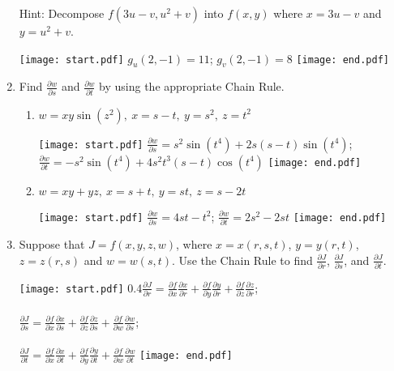 \documentclass[12pt]{article}
\begin{document}
\begin{enumerate}
Hint: Decompose $f(3u-v,u^2+v)$ into $f(x,y)$ where $x=3u-v$ and $y=u^2+v$.

\texttt{[image: start.pdf]}
{{$g_u(2,-1)=11$; $g_v(2,-1)=8$}}
\texttt{[image: end.pdf]}


\newpage

\item Find $\frac{\partial w}{\partial s}$ and $\frac{\partial w}{\partial t}$ by using the appropriate Chain Rule. 

\begin{enumerate}

\item $w=xy\sin{\left(z^2\right)},\ x=s-t,\ y=s^2,\ z=t^2$ 

\texttt{[image: start.pdf]}
{{$\frac{\partial w}{\partial s}=s^2\sin{\left(t^4\right)}+2s(s-t)\sin{\left(t^4\right)}$; $\frac{\partial w}{\partial t}=-s^2\sin{\left(t^4\right)}+4s^2t^3(s-t)\cos{\left(t^4\right)}$}}
\texttt{[image: end.pdf]}


\item $w=xy+yz,\ x=s+t,\ y=st,\ z=s-2t$ 

\texttt{[image: start.pdf]}
{{$\frac{\partial w}{\partial s}=4st-t^2$; $\frac{\partial w}{\partial t}=2s^2-2st$}}
\texttt{[image: end.pdf]}


\end{enumerate}

\item Suppose that $J=f(x,y,z,w)$, where $x=x(r,s,t)$, $y=y(r,t)$, $z=z(r,s)$ and $w=w(s,t)$.  Use the Chain Rule to find $\frac{\partial J}{\partial r}$, $\frac{\partial J}{\partial s}$, and $\frac{\partial J}{\partial t}$.

\texttt{[image: start.pdf]}
{{{0.4\linewidth}{$\frac{\partial J}{\partial r}=\frac{\partial f}{\partial x}\frac{\partial x}{\partial r}+\frac{\partial f}{\partial y}\frac{\partial y}{\partial r}+\frac{\partial f}{\partial z}\frac{\partial z}{\partial r}$; \\
\\
$\frac{\partial J}{\partial s}=\frac{\partial f}{\partial x}\frac{\partial x}{\partial s}+\frac{\partial f}{\partial z}\frac{\partial z}{\partial s}+\frac{\partial f}{\partial w}\frac{\partial w}{\partial s}$;\\
\\
$\frac{\partial J}{\partial t}=\frac{\partial f}{\partial x}\frac{\partial x}{\partial t}+\frac{\partial f}{\partial y}\frac{\partial y}{\partial t}+\frac{\partial f}{\partial w}\frac{\partial w}{\partial t}$
}}}
\texttt{[image: end.pdf]}



\end{enumerate}
\end{document}
